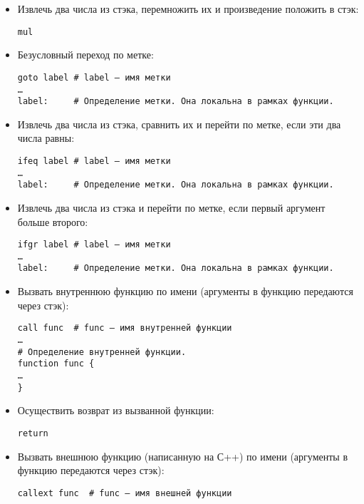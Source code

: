 \documentclass[a4paper,12pt]{article}
\begin{document}
\begin{itemize}
\item Извлечь два числа из стэка, перемножить их и произведение
  положить в стэк:

\begin{verbatim}
mul
\end{verbatim}

\item Безусловный переход по метке:

\begin{verbatim}
goto label # label – имя метки
…
label:     # Определение метки. Она локальна в рамках функции. 
\end{verbatim}

\item Извлечь два числа из стэка, сравнить их и перейти по метке, если
  эти два числа равны:

\begin{verbatim}
ifeq label # label – имя метки
…
label:     # Определение метки. Она локальна в рамках функции. 
\end{verbatim}

\item Извлечь два числа из стэка и перейти по метке, если первый
  аргумент больше второго:

\begin{verbatim}
ifgr label # label – имя метки
…
label:     # Определение метки. Она локальна в рамках функции.
\end{verbatim}

\item Вызвать внутреннюю функцию по имени (аргументы в функцию
  передаются через стэк):

\begin{verbatim}
call func  # func – имя внутренней функции
…
# Определение внутренней функции.
function func {
…
}
\end{verbatim}

\item Осуществить возврат из вызванной функции:

\begin{verbatim}
return
\end{verbatim}

\item Вызвать внешнюю функцию (написанную на С++) по имени (аргументы
  в функцию передаются через стэк):

\begin{verbatim}
callext func  # func – имя внешней функции
\end{verbatim}
\end{itemize}
\end{document}
